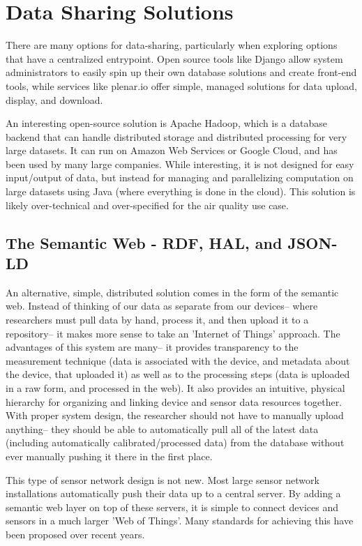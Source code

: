 \section{Data Sharing Solutions}

There are many options for data-sharing, particularly when exploring options that have a centralized entrypoint.  Open source tools like Django \cite{django} allow system administrators to easily spin up their own database solutions and create front-end tools, while services like plenar.io offer simple, managed solutions for data upload, display, and download.  

An interesting open-source solution is Apache Hadoop, \cite{hadoop} which is a database backend that can handle distributed storage and distributed processing for very large datasets.  It can run on Amazon Web Services or Google Cloud, and has been used by many large companies.  While interesting, it is not designed for easy input/output of data, but instead for managing and parallelizing computation on large datasets using Java (where everything is done in the cloud).  This solution is likely over-technical and over-specified for the air quality use case.  


\subsection{The Semantic Web - RDF, HAL, and JSON-LD}

An alternative, simple, distributed solution comes in the form of the semantic web.  Instead of thinking of our data as separate from our devices-- where researchers must pull data by hand, process it, and then upload it to a repository-- it makes more sense to take an 'Internet of Things' approach.  The advantages of this system are many-- it provides transparency to the measurement technique (data is associated with the device, and metadata about the device, that uploaded it) as well as to the processing steps (data is uploaded in a raw form, and processed in the web).  It also provides an intuitive, physical hierarchy for organizing and linking device and sensor data resources together.  With proper system design, the researcher should not have to manually upload anything-- they should be able to automatically pull all of the latest data (including automatically calibrated/processed data) from the database without ever manually pushing it there in the first place.

This type of sensor network design is not new.  Most large sensor network installations automatically push their data up to a central server.  By adding a semantic web layer on top of these servers, it is simple to connect devices and sensors in a much larger 'Web of Things'.  Many standards for achieving this have been proposed over recent years.    

